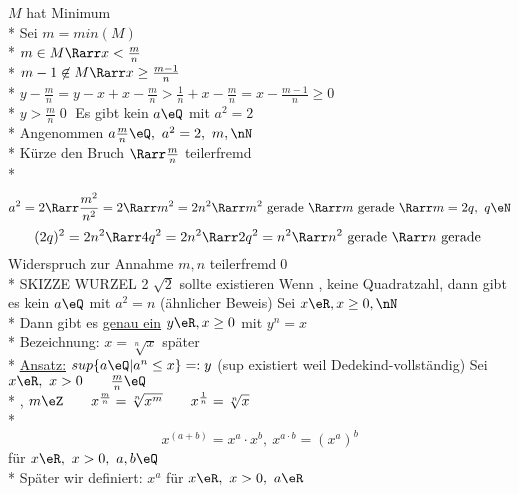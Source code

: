 $M$ hat Minimum\\*
Sei $m=min(M)$\\*
$m\in M \Rarr x<\frac{m}{n}$\\*
$m-1\not\in M \Rarr x\geq\frac{m-1}{n}$\\*
$y-\frac{m}{n} =y-x+x-\frac{m}{n}>\frac{1}{n}+x-\frac{m}{n}=x-\frac{m-1}{n}\geq0$\\*
$y>\frac{m}{n}$\qed
%
\Satz
Es gibt kein $a\eQ$ mit $a^2=2$\\*
\bew
Angenommen $a\frac{m}{n}\eQ,\ a^2=2,\ m,\nN$\\*
Kürze den Bruch $\Rarr \frac{m}{n}$ teilerfremd\\*
$$a^2=2\Rarr \frac{m^2}{n^2}=2 \Rarr m^2=2n^2 \Rarr m^2 \text{ gerade } \Rarr m \text{ gerade } \Rarr m=2q,\ q\eN$$
$$(2q)^2=2n^2 \Rarr 4q^2=2n^2 \Rarr 2q^2=n^2 \Rarr  n^2 \text{ gerade } \Rarr n \text{ gerade }$$
Widerspruch zur Annahme $m,n$ teilerfremd\qed\\*
SKIZZE WURZEL 2 \Rarr $\sqrt{2}$ sollte existieren %
\bem
Wenn \nN, keine Quadratzahl, dann gibt es kein $a\eQ$ mit $a^2=n$ (ähnlicher Beweis)
%
\Satz
Sei $x\eR, x\geq 0, \nN$\\*
Dann gibt es \ul{genau ein} $y\eR, x\geq 0$ mit $y^n=x$\\*
Bezeichnung: $x=\sqrt[n]{x}$
\bew
später\\*
\ul{Ansatz:} $sup\{a\eQ|a^n\leq x\}=:y$ (sup existiert weil \R{} Dedekind-vollständig)
%
\Def
Sei $x\eR,\ x>0\qquad \frac{m}{n}\eQ$\\*
\nN, $m\eZ\qquad x^{\frac{m}{n}}=\sqrt[n]{x^m}\qquad x^{\frac{1}{n}}=\sqrt[n]{x}$\\*
 $$x^{(a+b)}=x^a·x^b,\ x^{a·b}=(x^a)^b$$\hfill für $x\eR,\ x>0,\ a,b\eQ$\\*
\bem
Später wir definiert: $x^a$ für $x\eR,\ x>0,\ a\eR$
%
